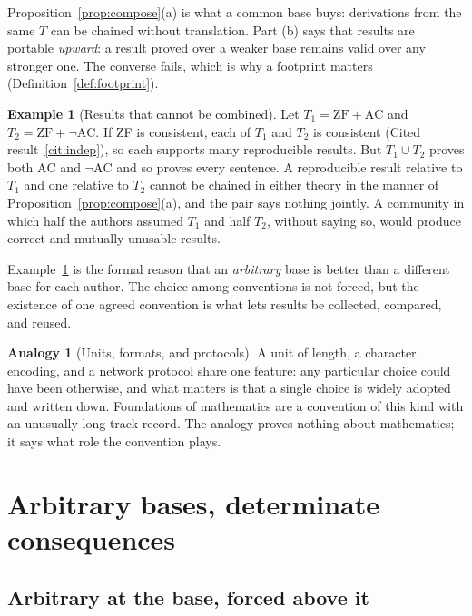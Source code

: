\documentclass[11pt]{article}
\theoremstyle{definition}
\newtheorem{example}[definition]{Example}
\newtheorem{analogy}[definition]{Analogy}
\theoremstyle{plain}
\theoremstyle{remark}
\begin{document}
Proposition~\ref{prop:compose}(a) is what a common base buys: derivations from the same $T$ can be chained without translation. Part (b) says that results are portable \emph{upward}: a result proved over a weaker base remains valid over any stronger one. The converse fails, which is why a footprint matters (Definition~\ref{def:footprint}).

\begin{example}[Results that cannot be combined]\label{ex:incompat}
Let $T_1=\mathrm{ZF}+\mathrm{AC}$ and $T_2=\mathrm{ZF}+\neg\mathrm{AC}$. If ZF is consistent, each of $T_1$ and $T_2$ is consistent (Cited result~\ref{cit:indep}), so each supports many reproducible results. But $T_1\cup T_2$ proves both $\mathrm{AC}$ and $\neg\mathrm{AC}$ and so proves every sentence. A reproducible result relative to $T_1$ and one relative to $T_2$ cannot be chained in either theory in the manner of Proposition~\ref{prop:compose}(a), and the pair says nothing jointly. A community in which half the authors assumed $T_1$ and half $T_2$, without saying so, would produce correct and mutually unusable results.
\end{example}

Example~\ref{ex:incompat} is the formal reason that an \emph{arbitrary} base is better than a different base for each author. The choice among conventions is not forced, but the existence of one agreed convention is what lets results be collected, compared, and reused.

\begin{analogy}[Units, formats, and protocols]\label{an:units}
A unit of length, a character encoding, and a network protocol share one feature: any particular choice could have been otherwise, and what matters is that a single choice is widely adopted and written down. Foundations of mathematics are a convention of this kind with an unusually long track record. The analogy proves nothing about mathematics; it says what role the convention plays.
\end{analogy}

\section{Arbitrary bases, determinate consequences}\label{sec:determinate}

\subsection{Arbitrary at the base, forced above it}
\end{document}
